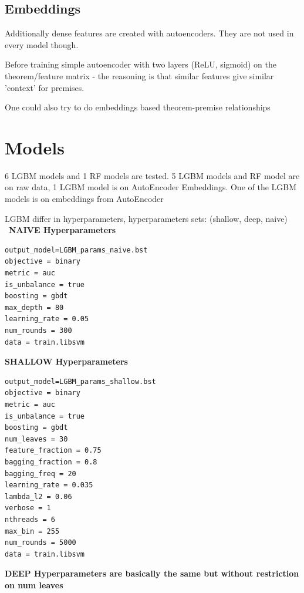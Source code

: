 \documentclass{article} %
\begin{document}
\subsection{Embeddings} 

Additionally dense features are created with autoencoders. They are not used in every model though.

Before training simple autoencoder with two layers (ReLU, sigmoid) on the theorem/feature matrix - the reasoning is that similar features give similar 'context' for premises.

One could also try to do embeddings based theorem-premise relationships

\section{Models}


6 LGBM models and 1 RF models are tested.
5 LGBM models and RF model are on raw data, 1 LGBM model is on AutoEncoder Embeddings.
One of the LGBM models is on embeddings from AutoEncoder

LGBM differ in hyperparameters, hyperparameters sets:
(shallow, deep, naive)  \newline\
\textbf{NAIVE Hyperparameters}
\begin{lstlisting}[language={}]
output_model=LGBM_params_naive.bst
objective = binary
metric = auc
is_unbalance = true
boosting = gbdt
max_depth = 80
learning_rate = 0.05
num_rounds = 300
data = train.libsvm

\end{lstlisting}


\textbf{SHALLOW Hyperparameters}
\begin{lstlisting}[language={}]
output_model=LGBM_params_shallow.bst
objective = binary
metric = auc
is_unbalance = true
boosting = gbdt
num_leaves = 30
feature_fraction = 0.75
bagging_fraction = 0.8
bagging_freq = 20
learning_rate = 0.035
lambda_l2 = 0.06
verbose = 1
nthreads = 6
max_bin = 255
num_rounds = 5000
data = train.libsvm
\end{lstlisting}
\textbf{DEEP Hyperparameters are basically the same but without restriction on num leaves}
\end{document}
